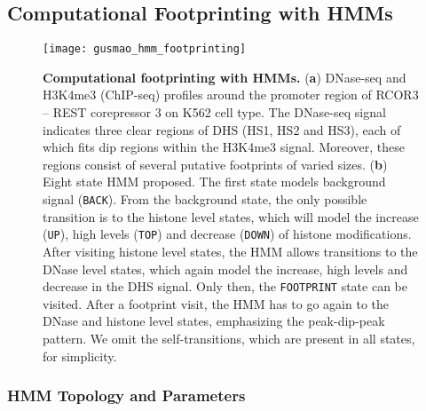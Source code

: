 \subsection{Computational Footprinting with HMMs}
\label{sec:computational.footprinting.hmms}


\begin{figure}[h!]
\centering
\texttt{[image: gusmao\_hmm\_footprinting]}
\caption[Computational footprinting with HMMs]{\textbf{Computational footprinting with HMMs.} (\textbf{a}) DNase-seq and H3K4me3 (ChIP-seq) profiles around the promoter region of RCOR3 -- REST corepressor 3 on K562 cell type. The DNase-seq signal indicates three clear regions of DHS (HS1, HS2 and HS3), each of which fits dip regions within the H3K4me3 signal. Moreover, these regions consist of several putative footprints of varied sizes. (\textbf{b}) Eight state HMM proposed. The first state models background signal ({\tt BACK}). From the background state, the only possible transition is to the histone level states, which will model the increase ({\tt UP}), high levels ({\tt TOP}) and decrease ({\tt DOWN}) of histone modifications. After visiting histone level states, the HMM allows transitions to the DNase level states, which again model the increase, high levels and decrease in the DHS signal. Only then, the {\tt FOOTPRINT} state can be visited. After a footprint visit, the HMM has to go again to the DNase and histone level states, emphasizing the peak-dip-peak pattern. We omit the self-transitions, which are present in all states, for simplicity.}
\label{fig:gusmao_hmm_footprinting}
\end{figure}

\subsubsection{HMM Topology and Parameters}
\label{sec:hmm.yopology.parameters}


